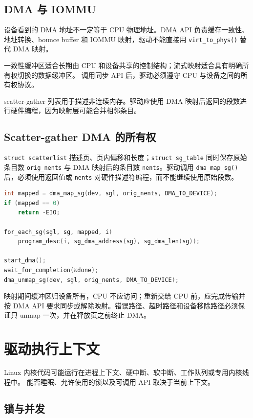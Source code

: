 \subsection{DMA 与 IOMMU}

设备看到的 DMA 地址不一定等于 CPU 物理地址。DMA API 负责缓存一致性、地址转换、bounce buffer 和 IOMMU 映射，驱动不能直接用 \texttt{virt\_to\_phys()} 替代 DMA 映射。

一致性缓冲区适合长期由 CPU 和设备共享的控制结构；流式映射适合具有明确所有权切换的数据缓冲区。
调用同步 API 后，驱动必须遵守 CPU 与设备之间的所有权协议。

scatter-gather 列表用于描述非连续内存。驱动应使用 DMA 映射后返回的段数进行硬件编程，因为映射层可能合并相邻条目。

\subsection{Scatter-gather DMA 的所有权}

\texttt{struct scatterlist} 描述页、页内偏移和长度；\texttt{struct sg\_table} 同时保存原始条目数 \texttt{orig\_nents} 与 DMA 映射后的条目数 \texttt{nents}。驱动调用 \texttt{dma\_map\_sg()} 后，必须使用返回值或 \texttt{nents} 对硬件描述符编程，而不能继续使用原始段数。

\begin{lstlisting}[language=C,caption={流式 scatter-gather DMA 的标准生命周期}]
int mapped = dma_map_sg(dev, sgl, orig_nents, DMA_TO_DEVICE);
if (mapped == 0)
    return -EIO;

for_each_sg(sgl, sg, mapped, i)
    program_desc(i, sg_dma_address(sg), sg_dma_len(sg));

start_dma();
wait_for_completion(&done);
dma_unmap_sg(dev, sgl, orig_nents, DMA_TO_DEVICE);
\end{lstlisting}

映射期间缓冲区归设备所有，CPU 不应访问；重新交给 CPU 前，应完成传输并按 DMA API 要求同步或解除映射。错误路径、超时路径和设备移除路径必须保证只 unmap 一次，并在释放页之前终止 DMA。

\section{驱动执行上下文}

Linux 内核代码可能运行在进程上下文、硬中断、软中断、工作队列或专用内核线程中。
能否睡眠、允许使用的锁以及可调用 API 取决于当前上下文。

\subsection{锁与并发}

